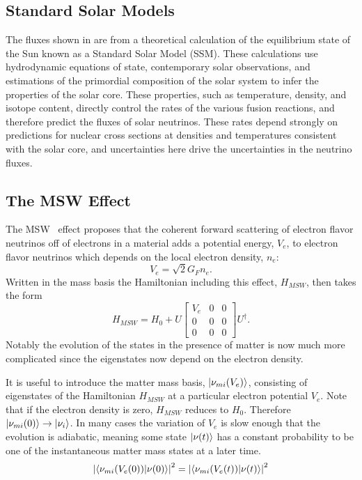 \subsection{Standard Solar Models}

The fluxes shown in  are from a theoretical calculation of the equilibrium state of the Sun known as a Standard Solar Model (SSM).
These calculations use hydrodynamic equations of state, contemporary solar observations, and estimations of the primordial composition of the solar system to infer the properties of the solar core.
These properties, such as temperature, density, and isotope content, directly control the rates of the various fusion reactions, and therefore predict the fluxes of solar neutrinos.
These rates depend strongly on predictions for nuclear cross sections at densities and temperatures consistent with the solar core, and uncertainties here drive the uncertainties in the neutrino fluxes.

\subsection{The MSW Effect}

The MSW~\cite{wolfenstein,mikheyev} effect proposes that the coherent forward scattering of electron flavor neutrinos off of electrons in a material adds a potential energy, $V_e$, to electron flavor neutrinos which depends on the local electron density, $n_e$:
\begin{equation}
V_e = \sqrt{2} G_F n_e.
\end{equation}
Written in the mass basis the Hamiltonian including this effect, $H_{MSW}$, then takes the form
\begin{equation}
H_{MSW} = H_{0} + U\begin{bmatrix}
V_e & 0 & 0 \\
0 & 0 & 0 \\
0 & 0 & 0
\end{bmatrix}U^\dagger.
\end{equation}
Notably the evolution of the states in the presence of matter is now much more complicated since the eigenstates now depend on the electron density.

It is useful to introduce the matter mass basis, $\ket{\nu_{mi}(V_e)}$, consisting of eigenstates of the Hamiltonian $H_{MSW}$ at a particular electron potential $V_e$.
Note that if the electron density is zero, $H_{MSW}$ reduces to $H_0$. Therefore $\ket{\nu_{mi}(0)} \rightarrow \ket{\nu_{i}}$.
In many cases the variation of $V_e$ is slow enough that the evolution is adiabatic, meaning some state $\ket{\nu(t)}$ has a constant probability to be one of the instantaneous matter mass states at a later time. 
\begin{equation}
\left| \braket{\nu_{mi}(V_e(0))}{\nu(0)} \right|^2 = \left| \braket{\nu_{mi}(V_e(t))}{\nu(t)} \right |^2
\end{equation}

